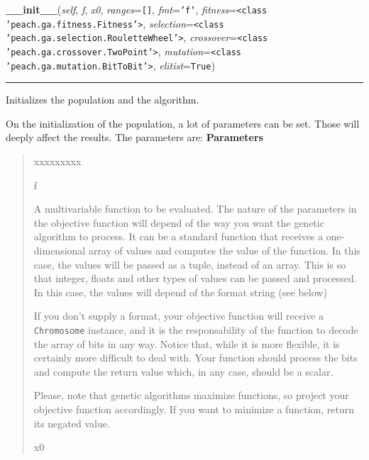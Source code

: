 \hspace{.8\funcindent}\begin{boxedminipage}{\funcwidth}

    \raggedright \textbf{\_\_init\_\_}(\textit{self}, \textit{f}, \textit{x0}, \textit{ranges}={\tt \texttt{[}\texttt{]}}, \textit{fmt}={\tt \texttt{'}\texttt{f}\texttt{'}}, \textit{fitness}={\tt {\textless}class 'peach.ga.fitness.Fitness'{\textgreater}}, \textit{selection}={\tt {\textless}class 'peach.ga.selection.RouletteWheel'{\textgreater}}, \textit{crossover}={\tt {\textless}class 'peach.ga.crossover.TwoPoint'{\textgreater}}, \textit{mutation}={\tt {\textless}class 'peach.ga.mutation.BitToBit'{\textgreater}}, \textit{elitist}={\tt True})

    \vspace{-1.5ex}

    \rule{\textwidth}{0.5\fboxrule}
\setlength{\parskip}{2ex}

Initializes the population and the algorithm.

On the initialization of the population, a lot of parameters can be set.
Those will deeply affect the results. The parameters are:
\setlength{\parskip}{1ex}
      \textbf{Parameters}
      \vspace{-1ex}

      \begin{quote}
        \begin{Ventry}{xxxxxxxxx}

          \item[f]


A multivariable function to be evaluated. The nature of the
parameters in the objective function will depend of the way you want
the genetic algorithm to process. It can be a standard function that
receives a one-dimensional array of values and computes the value of
the function. In this case, the values will be passed as a tuple,
instead of an array. This is so that integer, floats and other types
of values can be passed and processed. In this case, the values will
depend of the format string (see below)

If you don't supply a format, your objective function will receive a
\texttt{Chromosome} instance, and it is the responsability of the
function to decode the array of bits in any way. Notice that, while
it is more flexible, it is certainly more difficult to deal with.
Your function should process the bits and compute the return value
which, in any case, should be a scalar.

Please, note that genetic algorithms maximize functions, so project
your objective function accordingly. If you want to minimize a
function, return its negated value.
          \item[x0]



\end{Ventry}
\end{quote}
\end{boxedminipage}
